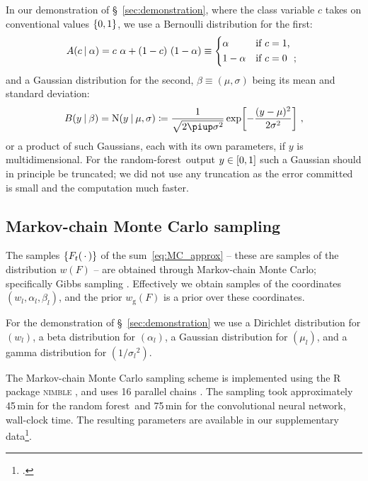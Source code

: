 \documentclass[\ifafour a4paper,12pt,\else a5paper,10pt,\fi%
onecolumn,oneside,article,%
british%
]{memoir}
\theoremstyle{remark}
\theoremstyle{innote}
\newcommand*{\pu}{\piup}%
\newcommand*{\defd}{\coloneqq}
\newcommand*{\dotv}{\mathord{\,\cdot\,}}%
\DeclarePairedDelimiter\clcl{[}{]}
\DeclarePairedDelimiter\set{\{}{\}} %
\renewcommand*{\|}[1][]{\nonscript\:#1\vert\nonscript\:\mathopen{}}
\newcommand*{\sect}{\S}%
\newcommand*{\chap}{ch.}%
\newcommand*{\wf}{w}
\newcommand*{\wfo}{w_{\textrm{g}}}
\newcommand*{\RF}{random forest}
\newcommand*{\rf}{random-forest}
\newcommand*{\CNN}{convolutional neural network}
\newcommand*{\No}{\mathrm{N}}
\begin{document}
In our demonstration of \sect~\ref{sec:demonstration}, where the class variable $c$ takes on conventional values $\set{0,1}$, we use a Bernoulli distribution for the first:
\begin{equation}
  \label{eq:distr_class}
  A(c \| \alpha) = c\ \alpha + (1-c)\ (1-\alpha) \equiv
  \begin{dcases*}
    \alpha& if $c=1$, \\ 1-\alpha & if $c=0$ \ ;
  \end{dcases*}
\end{equation}
and a Gaussian distribution for the second, $\beta \equiv (\mu,\sigma)$ being its mean and standard deviation:
\begin{equation}
  \label{eq:distr_output}
  B(y \| \beta) = \No(y \| \mu, \sigma) \defd \frac{1}{\sqrt{2\pu\sigma^{2}}} \exp\biggl[-\frac{(y-\mu)^{2}}{2\sigma^{2}}\biggr] \ ,
\end{equation}
or a product of such Gaussians, each with its own parameters, if $y$ is multidimensional. For the \rf\ output $y\in \clcl{0,1}$ such a Gaussian should in principle be truncated; we did not use any truncation as the error committed is small and the computation much faster.



\subsection{Markov-chain Monte Carlo sampling}
\label{sec:MCMC}

The samples $\set{F_{t}(\dotv)}$ of the sum~\eqref{eq:MC_approx} -- these are samples of the distribution $\wf(F)$ -- are obtained through Markov-chain Monte Carlo; specifically Gibbs sampling \autocites{neal1993}[\chap~29]{mackay1995_r2005}.
Effectively we obtain samples of the coordinates $(w_{l}, \alpha_{l}, \beta_{l})$, and the prior $\wfo(F)$ is a prior over these coordinates.

For the demonstration of \sect~\ref{sec:demonstration} we use a Dirichlet distribution for $(w_{l})$, a beta distribution for $(\alpha_{l})$, a Gaussian distribution for $(\mu_{l})$, and a gamma distribution for $(1/{\sigma_{l}}^{2})$.

The Markov-chain Monte Carlo sampling scheme is implemented using the R \autocites{rcoreteam1995_r2022} package \textsc{nimble} \autocites{nimble2016_r2021}, and uses 16 parallel chains \autocites[\addcomma\ scripts \texttt{RFmcmc.R} and \texttt{NNmcmc.R}]{dyrlandetal2022c}. The sampling took approximately 45\,min for the \RF\ and 75\,min for the \CNN, wall-clock time. The resulting parameters are available in our supplementary data\footcites[\addcomma\ files \texttt{transducer\_params-Random\_Forest.zip} and \texttt{transducer\_params-Neural\_Net.zip}]{dyrlandetal2022c}.
\end{document}
